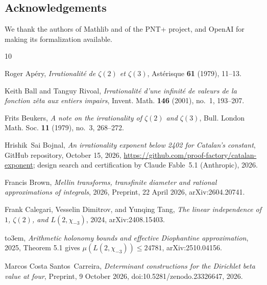 \documentclass[11pt]{amsart}
\theoremstyle{definition}
\theoremstyle{remark}
\numberwithin{equation}{section}
\begin{document}
\subsection*{Acknowledgements}
We thank the authors of Mathlib and of the PNT+ project, and OpenAI for making its formalization available.

\providecommand{\bysame}{\leavevmode\hbox to3em{\hrulefill}\thinspace}
\providecommand{\MR}{\relax\ifhmode\unskip\space\fi MR }
\providecommand{\MRhref}[2]{%
  \href{http://www.ams.org/mathscinet-getitem?mr=#1}{#2}
}
\providecommand{\href}[2]{#2}
\begin{thebibliography}{10}

Roger Ap\'ery, \emph{Irrationalit\'e de {$\zeta(2)$} et {$\zeta(3)$}},
  Ast\'erisque \textbf{61} (1979), 11--13.

Keith Ball and Tanguy Rivoal, \emph{Irrationalit\'e d'une infinit\'e de valeurs
  de la fonction z\^eta aux entiers impairs}, Invent. Math. \textbf{146}
  (2001), no.~1, 193--207.

Frits Beukers, \emph{A note on the irrationality of {$\zeta(2)$} and
  {$\zeta(3)$}}, Bull. London Math. Soc. \textbf{11} (1979), no.~3, 268--272.

Hrishik~Sai Bojnal, \emph{An irrationality exponent below 2402 for {C}atalan's
  constant}, GitHub repository, October 15, 2026,
  \url{https://github.com/proof-factory/catalan-exponent}; design search and
  certification by Claude Fable~5.1 (Anthropic), 2026.

Francis Brown, \emph{Mellin transforms, transfinite diameter and rational
  approximations of integrals}, 2026, Preprint, 22 April 2026,
  \href{https://arxiv.org/abs/2604.20741}{arXiv:2604.20741}.

Frank Calegari, Vesselin Dimitrov, and Yunqing Tang, \emph{The linear
  independence of {$1$}, {$\zeta(2)$}, and {$L(2,\chi_{-3})$}}, 2024,
  \href{https://arxiv.org/abs/2408.15403}{arXiv:2408.15403}.

\bysame, \emph{Arithmetic holonomy bounds and effective {D}iophantine
  approximation}, 2025, Theorem 5.1 gives $\mu(L(2,\chi_{-3}))\le 24781$,
  \href{https://arxiv.org/abs/2510.04156}{arXiv:2510.04156}.

Marcos Costa Santos~Carreira, \emph{Determinant constructions for the
  {D}irichlet beta value at four}, Preprint, 9 October 2026,
  \href{https://doi.org/10.5281/zenodo.23326647}{doi:10.5281/zenodo.23326647},
  2026.


\end{thebibliography}
\end{document}
